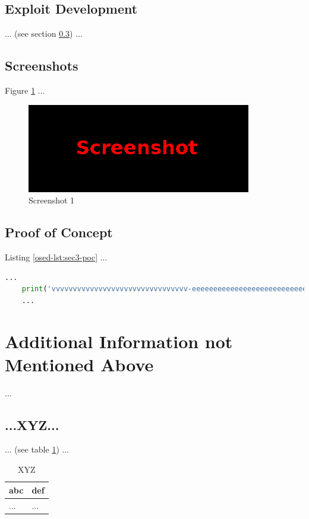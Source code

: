 \subsection{Exploit Development}\label{osed-sec:sec3-expl}
%
... (see section \ref{osed-sec:sec3-poc}) ...
%
%
%
\subsection{Screenshots}\label{osed-sec:sec3-screens}
%
Figure \ref{osed-fig:sec3-screen1} ...

\begin{figure}[H]
    \centering
    \includegraphics[width=\textwidth]{img/assignment1/screen1.png}
    \caption{Screenshot 1}\label{osed-fig:sec3-screen1}
\end{figure}
%
%
%
\subsection{Proof of Concept}\label{osed-sec:sec3-poc}
%
Listing \ref{osed-lst:sec3-poc} ...\\

\begin{lstlisting}[language=Python,caption={Proof of Concept}, label={osed-lst:sec3-poc}]
    ...
    print('vvvvvvvvvvvvvvvvvvvvvvvvvvvvvvvv-eeeeeeeeeeeeeeeeeeeeeeeeeeeeeeeeeeeeeeeeeee-looooooooooooooooooooooong-striiiiiiiiiiiiiing')
    ...
\end{lstlisting}
%
%
%
\section{Additional Information not Mentioned Above}\label{osed-sec:last}
%
...
%
%
%
\subsection{...XYZ...}\label{osed-sec:last-xyz}
%
... (see table \ref{osed-tbl:last-xyz}) ...

\begin{table}[H]
    \begin{tabularx}{\textwidth}{l|l}
        \textbf{abc} & \textbf{def} \\
        \hline
        ... & ...\\
    \end{tabularx}
    \caption{XYZ\label{osed-tbl:last-xyz}}
\end{table}
%
%
%